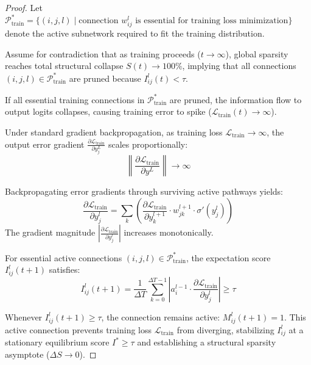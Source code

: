\begin{proof}
Let $\mathcal{P}_{\text{train}}^* = \{(i, j, l) \mid \text{connection } w_{ij}^l \text{ is essential for training loss minimization}\}$ denote the active subnetwork required to fit the training distribution.

Assume for contradiction that as training proceeds ($t \to \infty$), global sparsity reaches total structural collapse $S(t) \to 100\%$, implying that all connections $(i, j, l) \in \mathcal{P}_{\text{train}}^*$ are pruned because $I_{ij}^l(t) < \tau$.

If all essential training connections in $\mathcal{P}_{\text{train}}^*$ are pruned, the information flow to output logits collapses, causing training error to spike ($\mathcal{L}_{\text{train}}(t) \to \infty$). 

Under standard gradient backpropagation, as training loss $\mathcal{L}_{\text{train}} \to \infty$, the output error gradient $\frac{\partial \mathcal{L}_{\text{train}}}{\partial y_j^L}$ scales proportionally:
\begin{equation}
\left\| \frac{\partial \mathcal{L}_{\text{train}}}{\partial y^L} \right\| \to \infty
\end{equation}

Backpropagating error gradients through surviving active pathways yields:
\begin{equation}
\frac{\partial \mathcal{L}_{\text{train}}}{\partial y_j^l} = \sum_k \left( \frac{\partial \mathcal{L}_{\text{train}}}{\partial y_k^{l+1}} \cdot w_{jk}^{l+1} \cdot \sigma'(y_j^l) \right)
\end{equation}
The gradient magnitude $\left| \frac{\partial \mathcal{L}_{\text{train}}}{\partial y_j^l} \right|$ increases monotonically. 

For essential active connections $(i, j, l) \in \mathcal{P}_{\text{train}}^*$, the expectation score $I_{ij}^l(t+1)$ satisfies:
\begin{equation}
I_{ij}^l(t+1) = \frac{1}{\Delta T} \sum_{k=0}^{\Delta T - 1} \left| a_i^{l-1} \cdot \frac{\partial \mathcal{L}_{\text{train}}}{\partial y_j^l} \right| \ge \tau
\end{equation}

Whenever $I_{ij}^l(t+1) \ge \tau$, the connection remains active: $M_{ij}^l(t+1) = 1$. This active connection prevents training loss $\mathcal{L}_{\text{train}}$ from diverging, stabilizing $I_{ij}^l$ at a stationary equilibrium score $I^* \ge \tau$ and establishing a structural sparsity asymptote ($\Delta S \to 0$). 


\end{proof}
